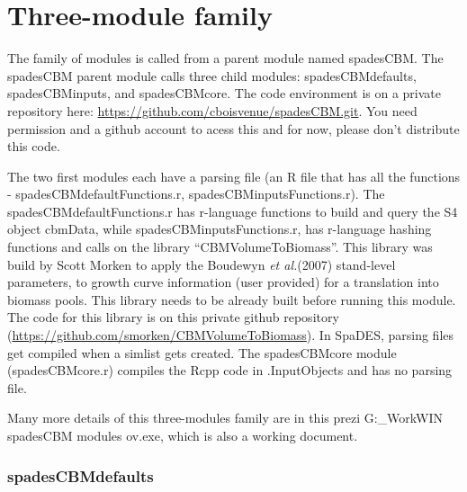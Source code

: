 \documentclass[]{article}
\begin{document}
\section{Three-module family}\label{three-module-family}

The family of modules is called from a parent module named spadesCBM.
The spadesCBM parent module calls three child modules:
spadesCBMdefaults, spadesCBMinputs, and spadesCBMcore. The code
environment is on a private repository here:
\url{https://github.com/cboisvenue/spadesCBM.git}. You need permission
and a github account to acess this and for now, please don't distribute
this code.

The two first modules each have a parsing file (an R file that has all
the functions - spadesCBMdefaultFunctions.r,
spadesCBMinputsFunctions.r). The spadesCBMdefaultFunctions.r has
r-language functions to build and query the S4 object cbmData, while
spadesCBMinputsFunctions.r, has r-language hashing functions and calls
on the library ``CBMVolumeToBiomass''. This library was build by Scott
Morken to apply the Boudewyn \emph{et al.}(2007) stand-level parameters,
to growth curve information (user provided) for a translation into
biomass pools. This library needs to be already built before running
this module. The code for this library is on this private github
repository (\url{https://github.com/smorken/CBMVolumeToBiomass}). In
SpaDES, parsing files get compiled when a simlist gets created. The
spadesCBMcore module (spadesCBMcore.r) compiles the Rcpp code in
.InputObjects and has no parsing file.

Many more details of this three-modules family are in this prezi
G:\RES\_Work\Work\SpaDES\spadesCBM\Prezi WIN spadesCBM modules ov.exe,
which is also a working document.

\subsubsection{spadesCBMdefaults}\label{spadescbmdefaults}
\end{document}
